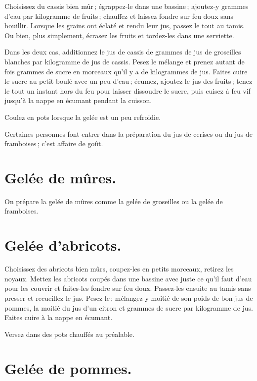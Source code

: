 Choisissez du cassis bien mûr ; égrappez-le dans une bassine ; ajoutez‑y
{\mmm} grammes d'eau par kilogramme de fruits ; chauffez et laissez
fondre sur feu doux sans bouillir. Lorsque les grains ont éclaté et rendu leur
jus, passez le tout au tamis. Ou bien, plus simplement, écrasez les fruits et
tordez-les dans une serviette.

Dans les deux cas, additionnez le jus de cassis de {\mmm} grammes de jus
de groseilles blanches par kilogramme de jus de cassis. Pesez le mélange et
prenez autant de fois {\mmm} grammes de sucre en morceaux qu'il y a de
kilogrammes de jus. Faites cuire le sucre au petit boulé avec un peu d'eau ;
écumez, ajoutez le jus des fruits ; tenez le tout un instant hors du feu pour
laisser dissoudre le sucre, puis cuisez à feu vif jusqu'à la nappe en écumant
pendant la cuisson.

Coulez en pots lorsque la gelée est un peu refroidie.

\sk

Gertaines personnes font entrer dans la préparation du jus de cerises ou du jus
de framboises ; c'est affaire de goût.

\section*{\centering Gelée de mûres.}
{}

On prépare la gelée de mûres comme la gelée de groseilles ou la gelée de
framboises.

\section*{\centering Gelée d'abricots.}
{}

Choisissez des abricots bien mûrs, coupez-les en petits morceaux, retirez les
noyaux. Mettez les abricots coupés dans une bassine avec juste ce qu'il faut
d'eau pour les couvrir et faites-les fondre sur feu doux. Passez-les ensuite au
tamis sans presser et recueillez le jus. Pesez-le ; mélangez-y moitié de son
poids de bon jus de pommes, la moitié du jus d'un citron et {\mmm}
grammes de sucre par kilogramme de jus. Faites cuire à la nappe en écumant.

Versez dans des pots chauffés au préalable.

\section*{\centering Gelée de pommes.}
{}

